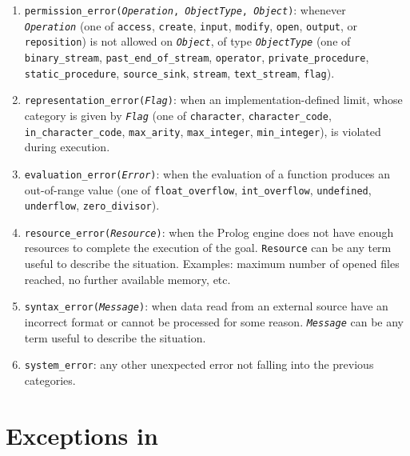 \begin{enumerate}
  \item \texttt{permission\_error(\textit{Operation}, \textit{ObjectType}, \textit{Object})}: whenever\\
       \texttt{\textit{Operation}} (one of \texttt{access}, \texttt{create}, \texttt{input}, \texttt{modify}, \texttt{open}, \texttt{output}, or \texttt{reposition}) is not allowed on \texttt{\textit{Object}}, of type \texttt{\textit{ObjectType}} (one of  \texttt{binary\_stream}, \texttt{past\_end\_of\_stream}, \texttt{operator}, \texttt{private\_procedure}, \texttt{static\_procedure}, \texttt{source\_sink}, \texttt{stream}, \texttt{text\_stream}, \texttt{flag}).

  \item \texttt{representation\_error(\textit{Flag})}: when an implementation-defined limit, whose category is given by \texttt{\textit{Flag}} (one of
      \texttt{character}, \texttt{character\_code}, \texttt{in\_character\_code}, \texttt{max\_arity}, \texttt{max\_integer}, \texttt{min\_integer}), is violated during execution.

  \item \texttt{evaluation\_error(\textit{Error})}: when the evaluation of a function produces an out-of-range value (one of \texttt{float\_overflow}, \texttt{int\_overflow}, \texttt{undefined}, \texttt{underflow}, \texttt{zero\_divisor}).

  \item \texttt{resource\_error(\textit{Resource})}: when the Prolog engine does not have enough resources to complete the execution of the goal. \texttt{Resource} can be any term useful to describe the situation. Examples: maximum number of opened files reached, no further available memory, etc.

  \item \texttt{syntax\_error(\textit{Message})}: when data read from an external source have an incorrect format or cannot be processed for some reason. \texttt{\textit{Message}} can be any term useful to describe the situation.

  \item \texttt{system\_error}: any other unexpected error not falling into the previous categories.
\end{enumerate}

\section{Exceptions in \tuprolog}
\label{sec:exceptions in tuprolog}

